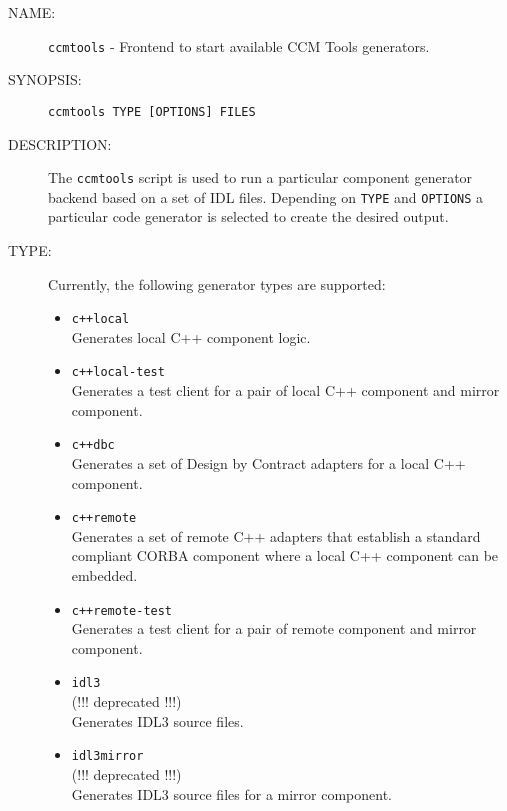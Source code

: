 \begin{description}

\item [NAME:] 
  {\tt ccmtools} - Frontend to start available CCM Tools generators.

\item [SYNOPSIS:] 
  {\tt ccmtools TYPE [OPTIONS] FILES}

\item [DESCRIPTION:]
The {\tt ccmtools} script is used to run a particular component 
generator backend based on a set of IDL files. 
Depending on {\tt TYPE} and {\tt OPTIONS} a particular code generator is 
selected to create the desired output.

\item [TYPE:]
  Currently, the following generator types are supported:
  \begin{itemize}
  \item {\tt c++local}\\
    Generates local C++ component logic.
    
  \item {\tt c++local-test} \\
    Generates a test client for a pair of local C++ component and
    mirror component.
    
  \item {\tt c++dbc} \\
    Generates a set of Design by Contract adapters for a local
    C++ component.

  \item {\tt c++remote} \\ 
    Generates a set of remote C++ adapters that establish a standard
    compliant CORBA component where a local C++ component can be embedded.

  \item {\tt c++remote-test}\\
    Generates a test client for a pair of remote component and mirror component.
    
  \item {\tt idl3 }\\  (!!! deprecated !!!) \\
    Generates IDL3 source files.

  \item {\tt idl3mirror }\\ (!!! deprecated !!!)\\
    Generates IDL3 source files for a mirror component.
    

\end{itemize}
\end{description}
